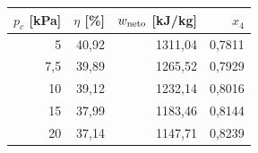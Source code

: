 \begin{tabular}{rrrr}
\toprule
$p_c$ [kPa] & $\eta$ [\%] & $w_{\rm neto}$ [kJ/kg] & $x_4$\\
\midrule
5 & 40,92 & 1311,04 & 0,7811 \\
7,5 & 39,89 & 1265,52 & 0,7929 \\
10 & 39,12 & 1232,14 & 0,8016 \\
15 & 37,99 & 1183,46 & 0,8144 \\
20 & 37,14 & 1147,71 & 0,8239 \\
\bottomrule
\end{tabular}
